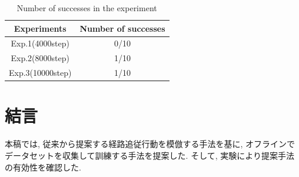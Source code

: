 \documentclass[10pt]{ujarticle}
\begin{document}
    \begin{table}[h]
        \centering
        \begin{tabular}{|c|c|} \hline
          Experiments & Number of successes \\ \hline
          Exp.1(4000step) & 0/10 \\ \hline
          Exp.2(8000step) & 1/10 \\ \hline
          Exp.3(10000step) & 1/10 \\ \hline
        \end{tabular}
        \caption{Number of successes in the experiment}
        \label{tb:result}
      \end{table}

    \section{結\hspace{2zw}言}%
    本稿では, 従来から提案する経路追従行動を模倣する手法を基に, オフラインでデータセットを収集して訓練する手法を提案した. そして, 実験により提案手法の有効性を確認した. 
\end{document}
